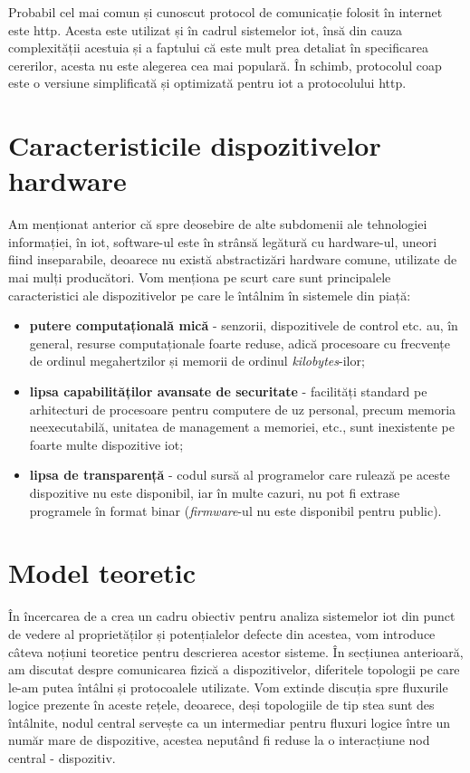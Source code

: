 Probabil cel mai comun și cunoscut protocol de comunicație folosit în internet este \acrfull{http}. Acesta este utilizat și în cadrul sistemelor \acrshort{iot}, însă din cauza complexității acestuia și a faptului că este mult prea detaliat în specificarea cererilor, acesta nu este alegerea cea mai populară. În schimb, protocolul \acrfull{coap} este o versiune simplificată și optimizată pentru \acrshort{iot} a protocolului \acrshort{http}.

\section{Caracteristicile dispozitivelor hardware}

Am menționat anterior că spre deosebire de alte subdomenii ale tehnologiei informației, în \acrshort{iot}, software-ul este în strânsă legătură cu hardware-ul, uneori fiind inseparabile, deoarece nu există abstractizări hardware comune, utilizate de mai mulți producători. Vom menționa pe scurt care sunt principalele caracteristici ale dispozitivelor pe care le întâlnim în sistemele din piață:

\begin{itemize}
    \item \textbf{putere computațională mică} - senzorii, dispozitivele de control etc. au, în general, resurse computaționale foarte reduse, adică procesoare cu frecvențe de ordinul megahertzilor și memorii de ordinul \textit{kilobytes}-ilor;
    \item \textbf{lipsa capabilităților avansate de securitate} - facilități standard pe arhitecturi de procesoare pentru computere de uz personal, precum memoria neexecutabilă, unitatea de management a memoriei, etc., sunt inexistente pe foarte multe dispozitive \acrshort{iot};
    \item \textbf{lipsa de transparență} - codul sursă al programelor care rulează pe aceste dispozitive nu este disponibil, iar în multe cazuri, nu pot fi extrase programele în format binar (\textit{firmware}-ul nu este disponibil pentru public).
\end{itemize}

\section{Model teoretic}

În încercarea de a crea un cadru obiectiv pentru analiza sistemelor \acrshort{iot} din punct de vedere al proprietăților și potențialelor defecte din acestea, vom introduce câteva noțiuni teoretice pentru descrierea acestor sisteme. În secțiunea anterioară, am discutat despre comunicarea fizică a dispozitivelor, diferitele topologii pe care le-am putea întâlni și protocoalele utilizate. Vom extinde discuția spre fluxurile logice prezente în aceste rețele, deoarece, deși topologiile de tip stea sunt des întâlnite, nodul central servește ca un intermediar pentru fluxuri logice între un număr mare de dispozitive, acestea neputând fi reduse la o interacțiune nod central - dispozitiv.

